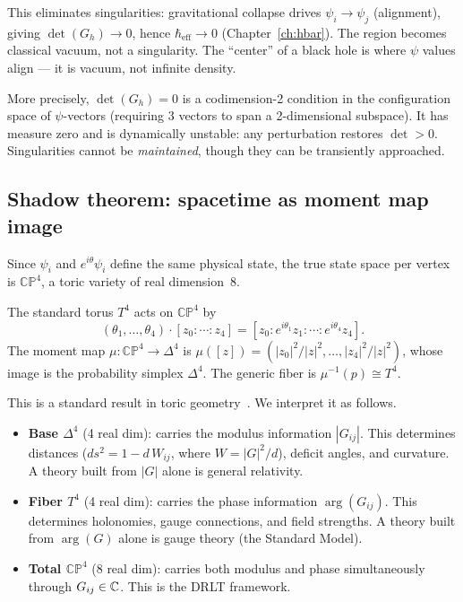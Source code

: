 This eliminates singularities: gravitational collapse drives $\psi_i \to \psi_j$ (alignment), giving $\det(G_h) \to 0$, hence $\hbar_\text{eff} \to 0$ (Chapter~\ref{ch:hbar}). The region becomes classical vacuum, not a singularity. The ``center'' of a black hole is where $\psi$ values align --- it is vacuum, not infinite density.

More precisely, $\det(G_h) = 0$ is a codimension-2 condition in the configuration space of $\psi$-vectors (requiring 3 vectors to span a 2-dimensional subspace).  It has measure zero and is dynamically unstable: any perturbation restores $\det > 0$.  Singularities cannot be \emph{maintained}, though they can be transiently approached.

\subsection{Shadow theorem: spacetime as moment map image}
\label{sec:shadow}

Since $\psi_i$ and $e^{i\theta}\psi_i$ define the same physical state, the true state space per vertex is $\mathbb{CP}^4$, a toric variety of real dimension~8.

\begin{proposition}
\label{prop:toric}
The standard torus $T^4$ acts on $\mathbb{CP}^4$ by
\begin{equation}
(\theta_1,\ldots,\theta_4)\cdot[z_0:\cdots:z_4]
= [z_0 : e^{i\theta_1}z_1 : \cdots : e^{i\theta_4}z_4].
\end{equation}
The moment map $\mu: \mathbb{CP}^4 \to \Delta^4$ is $\mu([z]) = (|z_0|^2/|z|^2,\ldots,|z_4|^2/|z|^2)$, whose image is the probability simplex $\Delta^4$.  The generic fiber is $\mu^{-1}(p) \cong T^4$.
\end{proposition}

This is a standard result in toric geometry~\cite{fulton1993}.  We interpret it as follows.

\begin{itemize}
\item \textbf{Base $\Delta^4$} (4 real dim): carries the modulus information $|G_{ij}|$.  This determines distances ($ds^2 = 1 - d\,W_{ij}$, where $W = |G|^2/d$), deficit angles, and curvature.  A theory built from $|G|$ alone is general relativity.

\item \textbf{Fiber $T^4$} (4 real dim): carries the phase information $\arg(G_{ij})$.  This determines holonomies, gauge connections, and field strengths.  A theory built from $\arg(G)$ alone is gauge theory (the Standard Model).

\item \textbf{Total $\mathbb{CP}^4$} (8 real dim): carries both modulus and phase simultaneously through $G_{ij} \in \mathbb{C}$.  This is the DRLT framework.
\end{itemize}

